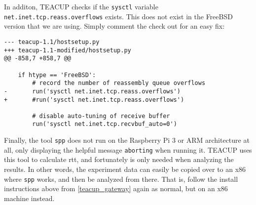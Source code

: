 In additon, TEACUP checks if the \lstinline{sysctl} variable \lstinline{net.inet.tcp.reass.overflows} exists. This does not exist in the FreeBSD version that we are using. Simply comment the check out for an easy fix:

\begin{lstlisting}
--- teacup-1.1/hostsetup.py
+++ teacup-1.1-modified/hostsetup.py
@@ -858,7 +858,7 @@

    if htype == 'FreeBSD':
        # record the number of reassembly queue overflows
-       run('sysctl net.inet.tcp.reass.overflows')
+       #run('sysctl net.inet.tcp.reass.overflows')

        # disable auto-tuning of receive buffer
        run('sysctl net.inet.tcp.recvbuf_auto=0')
\end{lstlisting}

Finally, the tool \lstinline{spp} does not run on the Raspberry Pi 3 or ARM architecture at all, only displaying the helpful message \lstinline{aborting} when running it. TEACUP uses this tool to calculate \gls{rtt}, and fortunately is only needed when analyzing the results. In other words, the experiment data can easily be copied over to an x86 where \lstinline{spp} works, and then be analyzed from there. That is, follow the install instructions above from \ref{teacup_gateway} again as normal, but on an x86 machine instead.